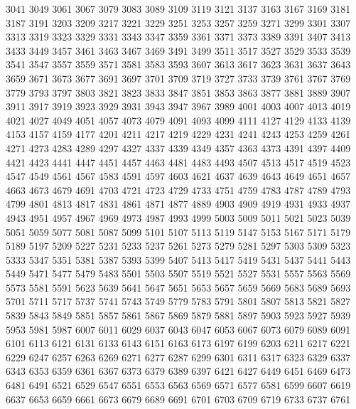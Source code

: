 \documentclass[11pt]{article}
\begin{document}
\begin{vncode}
 3041  3049  3061  3067  3079  3083  3089  3109  3119  3121  3137  3163  3167  3169  3181
 3187  3191  3203  3209  3217  3221  3229  3251  3253  3257  3259  3271  3299  3301  3307
 3313  3319  3323  3329  3331  3343  3347  3359  3361  3371  3373  3389  3391  3407  3413
 3433  3449  3457  3461  3463  3467  3469  3491  3499  3511  3517  3527  3529  3533  3539
 3541  3547  3557  3559  3571  3581  3583  3593  3607  3613  3617  3623  3631  3637  3643
 3659  3671  3673  3677  3691  3697  3701  3709  3719  3727  3733  3739  3761  3767  3769
 3779  3793  3797  3803  3821  3823  3833  3847  3851  3853  3863  3877  3881  3889  3907
 3911  3917  3919  3923  3929  3931  3943  3947  3967  3989  4001  4003  4007  4013  4019
 4021  4027  4049  4051  4057  4073  4079  4091  4093  4099  4111  4127  4129  4133  4139
 4153  4157  4159  4177  4201  4211  4217  4219  4229  4231  4241  4243  4253  4259  4261
 4271  4273  4283  4289  4297  4327  4337  4339  4349  4357  4363  4373  4391  4397  4409
 4421  4423  4441  4447  4451  4457  4463  4481  4483  4493  4507  4513  4517  4519  4523
 4547  4549  4561  4567  4583  4591  4597  4603  4621  4637  4639  4643  4649  4651  4657
 4663  4673  4679  4691  4703  4721  4723  4729  4733  4751  4759  4783  4787  4789  4793
 4799  4801  4813  4817  4831  4861  4871  4877  4889  4903  4909  4919  4931  4933  4937
 4943  4951  4957  4967  4969  4973  4987  4993  4999  5003  5009  5011  5021  5023  5039
 5051  5059  5077  5081  5087  5099  5101  5107  5113  5119  5147  5153  5167  5171  5179
 5189  5197  5209  5227  5231  5233  5237  5261  5273  5279  5281  5297  5303  5309  5323
 5333  5347  5351  5381  5387  5393  5399  5407  5413  5417  5419  5431  5437  5441  5443
 5449  5471  5477  5479  5483  5501  5503  5507  5519  5521  5527  5531  5557  5563  5569
 5573  5581  5591  5623  5639  5641  5647  5651  5653  5657  5659  5669  5683  5689  5693
 5701  5711  5717  5737  5741  5743  5749  5779  5783  5791  5801  5807  5813  5821  5827
 5839  5843  5849  5851  5857  5861  5867  5869  5879  5881  5897  5903  5923  5927  5939
 5953  5981  5987  6007  6011  6029  6037  6043  6047  6053  6067  6073  6079  6089  6091
 6101  6113  6121  6131  6133  6143  6151  6163  6173  6197  6199  6203  6211  6217  6221
 6229  6247  6257  6263  6269  6271  6277  6287  6299  6301  6311  6317  6323  6329  6337
 6343  6353  6359  6361  6367  6373  6379  6389  6397  6421  6427  6449  6451  6469  6473
 6481  6491  6521  6529  6547  6551  6553  6563  6569  6571  6577  6581  6599  6607  6619
 6637  6653  6659  6661  6673  6679  6689  6691  6701  6703  6709  6719  6733  6737  6761

\end{vncode}
\end{document}
